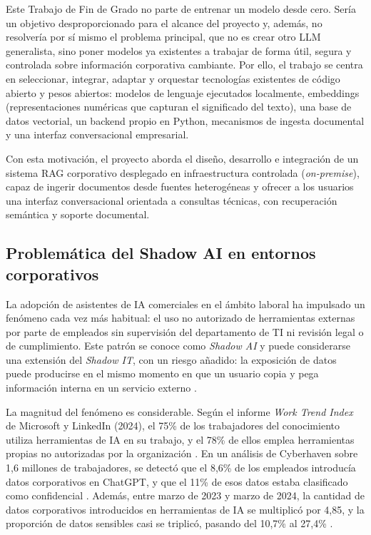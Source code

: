 Este Trabajo de Fin de Grado no parte de entrenar un modelo desde cero. Sería un objetivo desproporcionado para el alcance del proyecto y, además, no resolvería por sí mismo el problema principal, que no es crear otro LLM generalista, sino poner modelos ya existentes a trabajar de forma útil, segura y controlada sobre información corporativa cambiante. Por ello, el trabajo se centra en seleccionar, integrar, adaptar y orquestar tecnologías existentes de código abierto y pesos abiertos: modelos de lenguaje ejecutados localmente, embeddings (representaciones numéricas que capturan el significado del texto), una base de datos vectorial, un backend propio en Python, mecanismos de ingesta documental y una interfaz conversacional empresarial.

Con esta motivación, el proyecto aborda el diseño, desarrollo e integración de un sistema RAG corporativo desplegado en infraestructura controlada (\textit{on-premise}), capaz de ingerir documentos desde fuentes heterogéneas y ofrecer a los usuarios una interfaz conversacional orientada a consultas técnicas, con recuperación semántica y soporte documental.

\subsection{Problemática del Shadow AI en entornos corporativos}
\label{subsec:shadow_ai}

La adopción de asistentes de IA comerciales en el ámbito laboral ha impulsado un fenómeno cada vez más habitual: el uso no autorizado de herramientas externas por parte de empleados sin supervisión del departamento de TI ni revisión legal o de cumplimiento. Este patrón se conoce como \textit{Shadow AI} y puede considerarse una extensión del \textit{Shadow IT}, con un riesgo añadido: la exposición de datos puede producirse en el mismo momento en que un usuario copia y pega información interna en un servicio externo \cite{microsoft2024worktrend}.

La magnitud del fenómeno es considerable. Según el informe \textit{Work Trend Index} de Microsoft y LinkedIn (2024), el 75\% de los trabajadores del conocimiento utiliza herramientas de IA en su trabajo, y el 78\% de ellos emplea herramientas propias no autorizadas por la organización \cite{microsoft2024worktrend}. En un análisis de Cyberhaven sobre 1,6 millones de trabajadores, se detectó que el 8,6\% de los empleados introducía datos corporativos en ChatGPT, y que el 11\% de esos datos estaba clasificado como confidencial \cite{cyberhaven2024shadow}. Además, entre marzo de 2023 y marzo de 2024, la cantidad de datos corporativos introducidos en herramientas de IA se multiplicó por 4,85, y la proporción de datos sensibles casi se triplicó, pasando del 10,7\% al 27,4\% \cite{kalisa2024shadow}.

